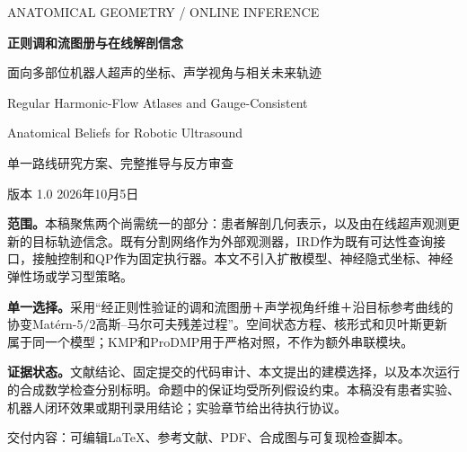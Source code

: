\documentclass[UTF8,11pt,a4paper,fontset=fandol]{ctexart}
\numberwithin{equation}{section}
\theoremstyle{plain}
\theoremstyle{definition}
\theoremstyle{remark}
\begin{document}
\begin{titlepage}
\centering
\vspace*{12mm}
{\small\sffamily ANATOMICAL GEOMETRY \quad / \quad ONLINE INFERENCE}\par
\vspace{12mm}
{\LARGE\bfseries 正则调和流图册与在线解剖信念}\par
\vspace{5mm}
{\Large 面向多部位机器人超声的坐标、声学视角与相关未来轨迹}\par
\vspace{8mm}
{\large Regular Harmonic-Flow Atlases and Gauge-Consistent\par Anatomical Beliefs for Robotic Ultrasound}\par
\vspace{12mm}
{\normalsize 单一路线研究方案、完整推导与反方审查}\par
{\small 版本 1.0 \qquad 2026年10月5日}\par
\vspace{10mm}
\begin{minipage}{0.92\textwidth}
\textbf{范围。}本稿聚焦两个尚需统一的部分：患者解剖几何表示，以及由在线超声观测更新的目标轨迹信念。既有分割网络作为外部观测器，IRD作为既有可达性查询接口，接触控制和QP作为固定执行器。本文不引入扩散模型、神经隐式坐标、神经弹性场或学习型策略。

\textbf{单一选择。}采用“经正则性验证的调和流图册＋声学视角纤维＋沿目标参考曲线的协变Mat\'ern-$5/2$高斯--马尔可夫残差过程”。空间状态方程、核形式和贝叶斯更新属于同一个模型；KMP和ProDMP用于严格对照，不作为额外串联模块。

\textbf{证据状态。}文献结论、固定提交的代码审计、本文提出的建模选择，以及本次运行的合成数学检查分别标明。命题中的保证均受所列假设约束。本稿没有患者实验、机器人闭环效果或期刊录用结论；实验章节给出待执行协议。
\end{minipage}
\vfill
{\small 交付内容：可编辑LaTeX、参考文献、PDF、合成图与可复现检查脚本。}\par
\end{titlepage}
\end{document}

